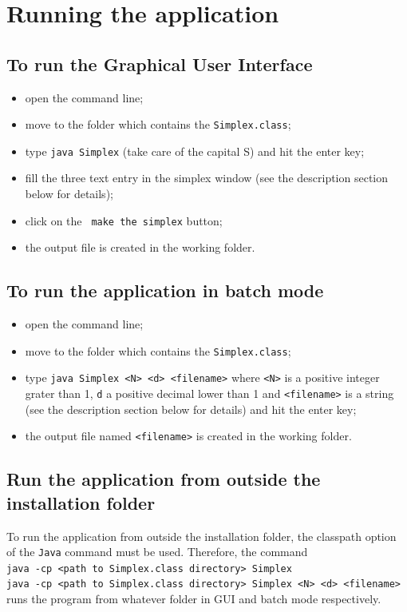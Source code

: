 \documentclass[12pt,a4paper]{article}
\begin{document}
\section*{Running the application}
\subsection*{To run the Graphical User Interface}
\begin{itemize}
\item open the command line;
\item move to the folder which contains the \verb+Simplex.class+; 
\item type \verb+java Simplex+ (take care of the capital S) and hit the enter key;
\item fill the three text entry in the simplex window (see the description section below for details);
\item click on the \verb+ make the simplex+ button;
\item the output file is created in the working folder.
\end{itemize}

\subsection*{To run the application in batch mode}
 \begin{itemize}
\item open the command line;
\item move to the folder which contains the \verb+Simplex.class+; 
\item type \verb+java Simplex <N> <d> <filename>+ where \verb+<N>+ is a positive integer grater than 1, \verb+d+ a positive decimal lower than 1 and \verb+<filename>+ is a string  (see the description section below for details) and hit the enter key;
\item the output file named \verb+<filename>+ is created in the working folder.
\end{itemize}

\subsection*{Run the application from outside the installation folder}
To run the application from outside the installation folder, the classpath option of the \verb+Java+ command must be used.
Therefore, the command\\
\verb+java -cp <path to Simplex.class directory> Simplex+\\
\verb+java -cp <path to Simplex.class directory> Simplex <N> <d> <filename>+\\
runs the program from whatever folder in GUI and batch mode respectively.
\end{document}
